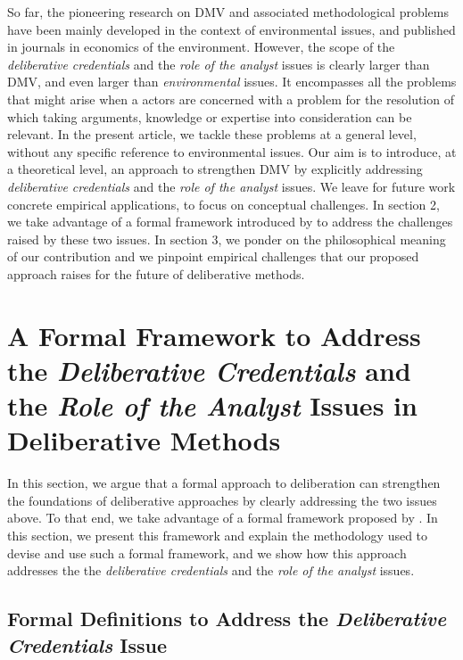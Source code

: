 \documentclass[version=3.21, pagesize, twoside=off, bibliography=totoc, DIV=calc, fontsize=12pt, a4paper, french, english]{scrartcl}
\begin{document}
So far, the pioneering research on \ac{DMV} and associated methodological problems have been mainly developed in the context of environmental issues, and published in journals in economics of the environment. However, the scope of the \emph{deliberative credentials} and the \emph{role of the analyst} issues is clearly larger than \ac{DMV}, and even larger than \emph{environmental} issues. It encompasses all the problems that might arise when a actors are concerned with a problem for the resolution of which taking arguments, knowledge or expertise into consideration can be relevant. In the present article, we tackle these problems at a general level, without any specific reference to environmental issues. Our aim is to introduce, at a theoretical level, an approach to strengthen \ac{DMV} by explicitly addressing \emph{deliberative credentials} and the \emph{role of the analyst} issues. We leave for future work concrete empirical applications, to focus on conceptual challenges. In section 2, we take advantage of a formal framework introduced by \citet{cailloux_formal_2019} to address the challenges raised by these two issues.
In section 3, we ponder on the philosophical meaning of our contribution and we pinpoint empirical challenges that our proposed approach raises for the future of deliberative methods.

\section{A Formal Framework to Address the \emph{Deliberative Credentials} and the \emph{Role of the Analyst} Issues in Deliberative Methods}
In this section, we argue that a formal approach to deliberation can strengthen the foundations of deliberative approaches by clearly addressing the two issues above. To that end, we take advantage of a formal framework proposed by \citet{cailloux_formal_2019}. In this section, we present this framework and explain the methodology used to devise and use such a formal framework, and we show how this approach addresses the the \emph{deliberative credentials} and the \emph{role of the analyst} issues.

\subsection{Formal Definitions to Address the \emph{Deliberative Credentials} Issue}
\end{document}
